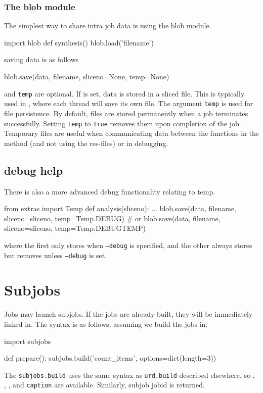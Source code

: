 \subsubsection*{The blob module}
The simplest way to share intra job data is using the blob module.
\begin{python}
import blob
def synthesis()
  blob.load('filename')
\end{python}
saving data is as follows
\begin{python}
  blob.save(data, filename, sliceno=None, temp=None)
\end{python}
\sliceno and \texttt{temp} are optional.  If \sliceno is set, data is
stored in a sliced file.  This is typically used in \analysis, where
each thread will save its own file.  The argument \texttt{temp} is
used for file persistence.  By default, files are stored permanently
when a job terminates successfully.  Setting \texttt{temp} to
\texttt{True} removes them upon completion of the job.  Temporary
files are useful when communicating data between the functions in the
method (and not using the res-files) or in debugging.


\subsection{debug help}
There is also a more advanced debug functionality relating to temp.
\begin{python}
from extras import Temp
def analysis(sliceno):
  ...
  blob.save(data, filename, sliceno=sliceno, temp=Temp.DEBUG)
  # or
  blob.save(data, filename, sliceno=sliceno, temp=Temp.DEBUGTEMP)
\end{python}
where the first only stores when \texttt{--debug} is specified, and
the other always stores but removes unless \texttt{--debug} is set.


\newpage
\section{Subjobs}

Jobs may launch subjobs.  If the jobs are already built, they will be
immediately linked in.  The syntax is as follows, assuming we build
the jobs in\prepare:
\begin{python}
import subjobs

def prepare():
  subjobs.build('count_items', options=dict(length=3))
\end{python}
The \texttt{subjobs.build} uses the same syntax as \texttt{urd.build}
described elsewhere, so \options, \datasets, \jobids, and
\texttt{caption} are available.  Similarly, subjob jobid is returned.

